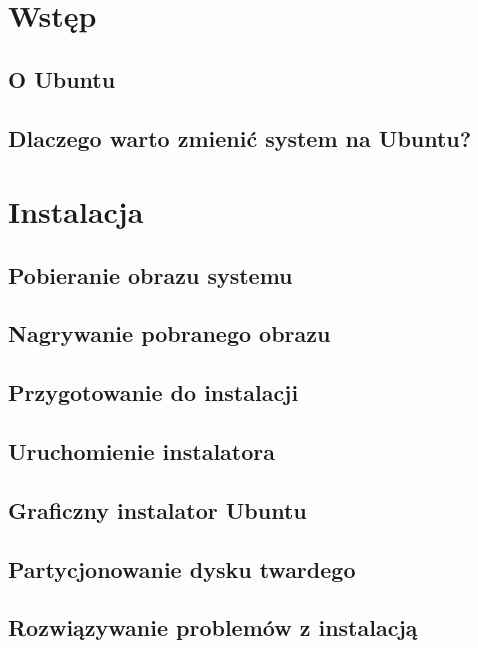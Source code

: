 \documentclass[a4paper,11pt,oneside]{mwart}
\begin{document}


\section{Wstęp}
	
	\subsection{O Ubuntu}
		
	\subsection{Dlaczego warto zmienić system na Ubuntu?}
		
\section{Instalacja}
	\subsection{Pobieranie obrazu systemu}
		
	\subsection{Nagrywanie pobranego obrazu}
		
		
	\subsection{Przygotowanie do instalacji}
		
	\subsection{Uruchomienie instalatora}
		
	\subsection{Graficzny instalator Ubuntu}
		
	\subsection{Partycjonowanie dysku twardego}
		
	\subsection{Rozwiązywanie problemów z instalacją}
		
\end{document}

